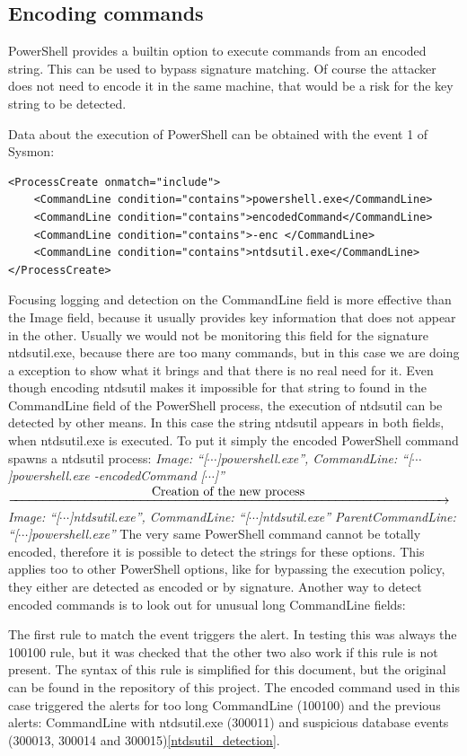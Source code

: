 \subsection{Encoding commands}
PowerShell provides a builtin option to execute commands from an encoded string. This can be used to bypass signature matching. Of course the attacker does not need to encode it in the same machine, that would be a risk for the key string to be detected.
\linej

\linej
Data about the execution of PowerShell can be obtained with the event 1 of Sysmon:
\begin{lstlisting}[style=xml]
<ProcessCreate onmatch="include">
	<CommandLine condition="contains">powershell.exe</CommandLine>
	<CommandLine condition="contains">encodedCommand</CommandLine>
	<CommandLine condition="contains">-enc </CommandLine>
	<CommandLine condition="contains">ntdsutil.exe</CommandLine>
</ProcessCreate>
\end{lstlisting}
\linej
Focusing logging and detection on the CommandLine field is more effective than the Image field, because it usually provides key information that does not appear in the other. Usually we would not be monitoring this field for the signature ntdsutil.exe, because there are too many commands, but in this case we are doing a exception to show what it brings and that there is no real need for it.
\linej
Even though encoding ntdsutil makes it impossible for that string to found in the CommandLine field of the PowerShell process, the execution of ntdsutil can be detected by other means. In this case the string ntdsutil appears in both fields, when ntdsutil.exe is executed.
\linej
\linej
\linej
To put it simply the encoded PowerShell command spawns a ntdsutil process:
\linej
\lineh
\textit{Image: ``[$\cdots$]powershell.exe'',
\linej
CommandLine: ``[$\cdots$]powershell.exe -encodedCommand [$\cdots$]''}
\linej
\linej
$\xrightarrow{\makebox[\textwidth]{Creation of the new process}}$
\textit{Image: ``[$\cdots$]ntdsutil.exe'',
\linej
CommandLine: ``[$\cdots$]ntdsutil.exe''
\linej
ParentCommandLine: ``[$\cdots$]powershell.exe''}
\linej
\lineh
\linej
\linej
The very same PowerShell command cannot be totally encoded, therefore it is possible to detect the strings for these options. This applies too to other PowerShell options, like for bypassing the execution policy, they either are detected as encoded or by signature\cite{powershell_adsecurity}.
Another way to detect encoded commands is to look out for unusual long CommandLine fields:

\linej
The first rule to match the event triggers the alert.
In testing this was always the 100100 rule, but it was checked that the other two also work if this rule is not present.
The syntax of this rule is simplified for this document, but the original can be found in the repository of this project\cite{memoria_github}.
\linej
\linej
The encoded command used in this case triggered the alerts for too long CommandLine (100100) and the previous alerts: CommandLine with ntdsutil.exe (300011) and suspicious database events (300013, 300014 and 300015)\ref{ntdsutil_detection}.

